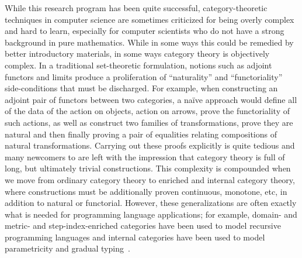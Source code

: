 \documentclass{llncs}
\begin{document}
While this research program has been quite successful,
category-theoretic techniques in computer science are sometimes
criticized for being overly complex and hard to learn, especially for
computer scientists who do not have a strong background in pure
mathematics.
%
While in some ways this could be remedied by better introductory
materials, in some ways category theory is objectively complex.
%
In a traditional set-theoretic formulation, notions such as adjoint
functors and limits produce a proliferation of ``naturality'' and
``functoriality'' side-conditions that must be discharged.
%
For example, when constructing an adjoint pair of
functors between two categories, a na\"ive approach would define all of
the data of the action on objects, action on arrows, prove the
functoriality of such actions, as well as construct two families of
transformations, prove they are natural and then finally proving a pair
of equalities relating compositions of natural transformations.
%
Carrying out these proofs explicitly is quite tedious and many newcomers
to are left with the impression that category theory is full of long,
but ultimately trivial constructions.
%
This complexity is compounded when we move from ordinary category theory to
enriched and internal category theory, where constructions must be
additionally proven continuous, monotone, etc, in addition to natural
or functorial.
%
However, these generalizations are often exactly what is needed for programming
language applications; for example, domain- and metric- and
step-index-enriched categories have been used to model recursive
programming languages and internal categories have been used to model
parametricity and gradual
typing~\cite{wand197913,topos-of-trees,reflexive-graphs,double-cats-gradual-typing}.
\end{document}
